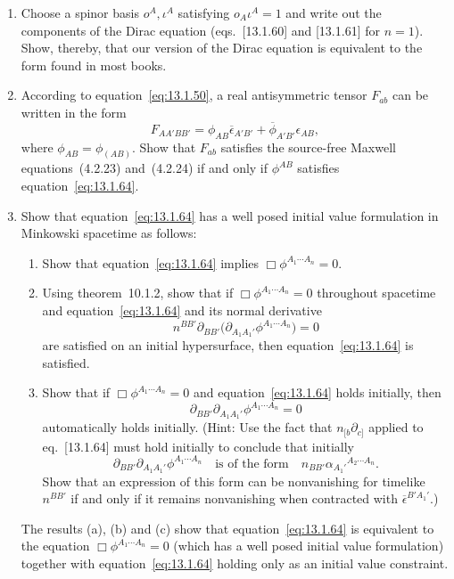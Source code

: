 \begin{enumerate}[label=\arabic*.,leftmargin=2em,itemsep=1.2ex]
\item
Choose a spinor basis \(o^A,\iota^A\) satisfying \(o_A\iota^A=1\) and write out the
components of the Dirac equation (eqs.~[13.1.60] and [13.1.61] for \(n=1\)). Show,
thereby, that our version of the Dirac equation is equivalent to the form found in
most books.

\item
According to equation~\eqref{eq:13.1.50}, a real antisymmetric tensor \(F_{ab}\)
can be written in the form
\[
  F_{AA'BB'}=\phi_{AB}\overline\epsilon_{A'B'}
    +\overline\phi_{A'B'}\epsilon_{AB},
\]
where \(\phi_{AB}=\phi_{(AB)}\). Show that \(F_{ab}\) satisfies the source-free
Maxwell equations~(4.2.23) and~(4.2.24) if and only if \(\phi^{AB}\) satisfies
equation~\eqref{eq:13.1.64}.

\item
Show that equation~\eqref{eq:13.1.64} has a well posed initial value formulation
in Minkowski spacetime as follows:
\begin{enumerate}[label=\alph*),leftmargin=2em,itemsep=.45ex]
\item Show that equation~\eqref{eq:13.1.64} implies
\(\Box\phi^{A_1\cdots A_n}=0\).
\item Using theorem~10.1.2, show that if
\(\Box\phi^{A_1\cdots A_n}=0\) throughout spacetime and equation~\eqref{eq:13.1.64}
and its normal derivative
\[
  n^{BB'}\partial_{BB'}
  \bigl(\partial_{A_1A_1'}\phi^{A_1\cdots A_n}\bigr)=0
\]
are satisfied on an initial hypersurface, then equation~\eqref{eq:13.1.64} is
satisfied.
\item Show that if \(\Box\phi^{A_1\cdots A_n}=0\) and
equation~\eqref{eq:13.1.64} holds initially, then
\[
  \partial_{BB'}\partial_{A_1A_1'}\phi^{A_1\cdots A_n}=0
\]
automatically holds initially. (Hint: Use the fact that \(n_{[b}\partial_{c]}\) applied to
eq.~[13.1.64] must hold initially to conclude that initially
\[
  \partial_{BB'}\partial_{A_1A_1'}\phi^{A_1\cdots A_n}
  \quad\text{is of the form}\quad
  n_{BB'}\alpha_{A_1'}{}^{A_2\cdots A_n}.
\]
Show that an expression of this form can be nonvanishing for timelike \(n^{BB'}\)
if and only if it remains nonvanishing when contracted with
\(\overline\epsilon^{B'A_1'}\).)
\end{enumerate}
The results (a), (b) and (c) show that equation~\eqref{eq:13.1.64} is equivalent to
the equation \(\Box\phi^{A_1\cdots A_n}=0\) (which has a well posed initial value
formulation) together with equation~\eqref{eq:13.1.64} holding only as an initial
value constraint.


\end{enumerate}

